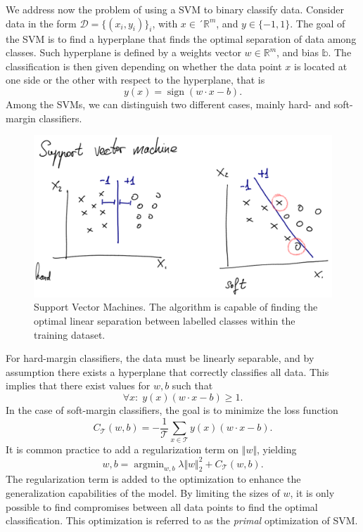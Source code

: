\documentclass[]{report}
\newcommand{\sign}{\ensuremath{\operatorname{sign}}}
\begin{document}
We address now the problem of using a SVM to binary classify data. Consider data in the form $\mathcal D = \{(x_i, y_i)\}_i$, with $x \in´ \mathbb R^m$, and $y \in \{-1,1\}$. The goal of the SVM is to find a hyperplane that finds the optimal separation of data among classes. Such hyperplane is defined by a weights vector $w \in \mathbb R^m$, and bias $\mathbb b$. The classification is then given depending on whether the data point $x$ is located at one side or the other with respect to the hyperplane, that is
\begin{equation}
y(x) = \sign\left( w \cdot x - b \right).
\end{equation}
Among the SVMs, we can distinguish two different cases, mainly hard- and soft-margin classifiers. 

\begin{figure}
\includegraphics[width = .9\linewidth]{images/SVM}
\caption{Support Vector Machines. The algorithm is capable of finding the optimal linear separation between labelled classes within the training dataset. }
\label{fig.svm}
\end{figure}

For hard-margin classifiers, the data must be linearly separable, and by assumption there exists a hyperplane that correctly classifies all data. This implies that there exist values for $w, b$ such that
\begin{equation}
\forall x: \; y(x) (w \cdot x - b) \geq 1.
\end{equation}
In the case of soft-margin classifiers, the goal is to minimize the loss function
\begin{equation}
C_{\mathcal T}(w, b) = - \frac{1}{\mathcal T}\sum_{x \in \mathcal T} y(x) \left(w \cdot x - b \right).
\end{equation}
It is common practice to add a regularization term on $\Vert w \Vert$, yielding
\begin{equation}
w, b = \operatorname{argmin}_{w, b} \lambda \Vert w \Vert^2_2 + C_{\mathcal T}(w, b).
\end{equation}
The regularization term is added to the optimization to enhance the generalization capabilities of the model. By limiting the sizes of $w$, it is only possible to find compromises between all data points to find the optimal classification. This optimization is referred to as the \textit{primal} optimization of SVM. 
\end{document}
